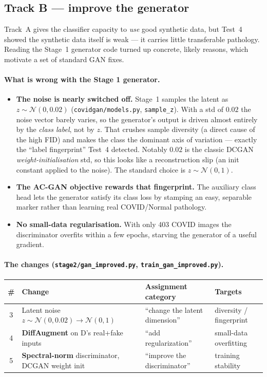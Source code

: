 \documentclass[11pt]{article}
\newcommand{\code}[1]{\texttt{#1}}
\begin{document}
\subsection{Track B --- improve the generator}
\label{sec:trackB}
Track~A gives the classifier capacity to \emph{use} good synthetic data, but
Test~4 showed the synthetic data itself is weak --- it carries little transferable
pathology. Reading the Stage~1 generator code turned up concrete, likely reasons,
which motivate a set of standard GAN fixes.

\paragraph{What is wrong with the Stage 1 generator.}
\begin{itemize}[nosep,leftmargin=1.4em]
  \item \textbf{The noise is nearly switched off.} Stage~1 samples the latent as
        $z \sim \mathcal{N}(0, 0.02)$ (\code{covidgan/models.py}, \code{sample\_z}).
        With a std of $0.02$ the noise vector barely varies, so the generator's
        output is driven almost entirely by the \emph{class label}, not by $z$.
        That crushes sample diversity (a direct cause of the high FID) and makes
        the class the dominant axis of variation --- exactly the ``label
        fingerprint'' Test~4 detected. Notably $0.02$ is the classic DCGAN
        \emph{weight-initialisation} std, so this looks like a reconstruction slip
        (an init constant applied to the noise). The standard choice is
        $z \sim \mathcal{N}(0,1)$.
  \item \textbf{The AC-GAN objective rewards that fingerprint.} The auxiliary
        class head lets the generator satisfy its class loss by stamping an easy,
        separable marker rather than learning real COVID/Normal pathology.
  \item \textbf{No small-data regularisation.} With only 403 COVID images the
        discriminator overfits within a few epochs, starving the generator of a
        useful gradient.
\end{itemize}

\paragraph{The changes (\code{stage2/gan\_improved.py}, \code{train\_gan\_improved.py}).}
\begin{table}[htbp]
\centering\small
\begin{tabular}{@{}clp{3.4cm}l@{}}
\toprule
\# & \textbf{Change} & \textbf{Assignment category} & \textbf{Targets} \\
\midrule
3 & Latent noise $z\sim\mathcal{N}(0,0.02)\to\mathcal{N}(0,1)$ & ``change the latent dimension'' & diversity / fingerprint \\
4 & \textbf{DiffAugment} on D's real+fake inputs & ``add regularization'' & small-data overfitting \\
5 & \textbf{Spectral-norm} discriminator, DCGAN weight init & ``improve the discriminator'' & training stability \\
\bottomrule
\end{tabular}
\end{table}
\end{document}
